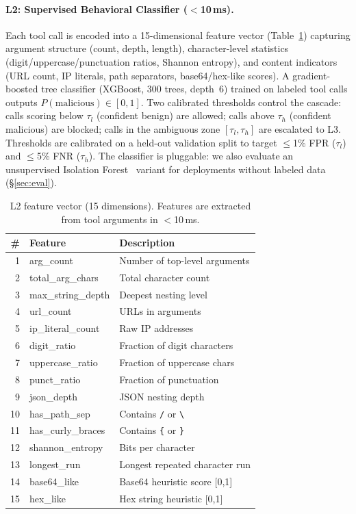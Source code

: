 \documentclass[sigconf,nonacm]{acmart}
\begin{document}
\paragraph{L2: Supervised Behavioral Classifier ($<$10\,ms).}
Each tool call is encoded into a 15-dimensional feature vector (Table~\ref{tab:features}) capturing argument structure (count, depth, length), character-level statistics (digit/uppercase/punctuation ratios, Shannon entropy), and content indicators (URL count, IP literals, path separators, base64/hex-like scores). A gradient-boosted tree classifier (XGBoost, 300 trees, depth~6) trained on labeled tool calls outputs $P(\text{malicious}) \in [0,1]$. Two calibrated thresholds control the cascade: calls scoring below $\tau_l$ (confident benign) are allowed; calls above $\tau_h$ (confident malicious) are blocked; calls in the ambiguous zone $[\tau_l, \tau_h]$ are escalated to L3. Thresholds are calibrated on a held-out validation split to target $\le$1\% FPR ($\tau_l$) and $\le$5\% FNR ($\tau_h$). The classifier is pluggable: we also evaluate an unsupervised Isolation Forest~\cite{zhao2019pyod} variant for deployments without labeled data (\S\ref{sec:eval}).

\begin{table}[t]
\centering
\footnotesize
\caption{L2 feature vector (15 dimensions). Features are extracted from tool arguments in $<$10\,ms.}
\vspace{-0.1in}
\label{tab:features}
\setlength{\tabcolsep}{3pt}
\begin{tabular}{rll}
\toprule
\# & Feature & Description \\
\midrule
1 & arg\_count & Number of top-level arguments \\
2 & total\_arg\_chars & Total character count \\
3 & max\_string\_depth & Deepest nesting level \\
4 & url\_count & URLs in arguments \\
5 & ip\_literal\_count & Raw IP addresses \\
6 & digit\_ratio & Fraction of digit characters \\
7 & uppercase\_ratio & Fraction of uppercase chars \\
8 & punct\_ratio & Fraction of punctuation \\
9 & json\_depth & JSON nesting depth \\
10 & has\_path\_sep & Contains \texttt{/} or \texttt{\textbackslash} \\
11 & has\_curly\_braces & Contains \texttt{\{} or \texttt{\}} \\
12 & shannon\_entropy & Bits per character \\
13 & longest\_run & Longest repeated character run \\
14 & base64\_like & Base64 heuristic score [0,1] \\
15 & hex\_like & Hex string heuristic [0,1] \\
\bottomrule
\end{tabular}
\vspace{-0.15in}
\end{table}
\end{document}
